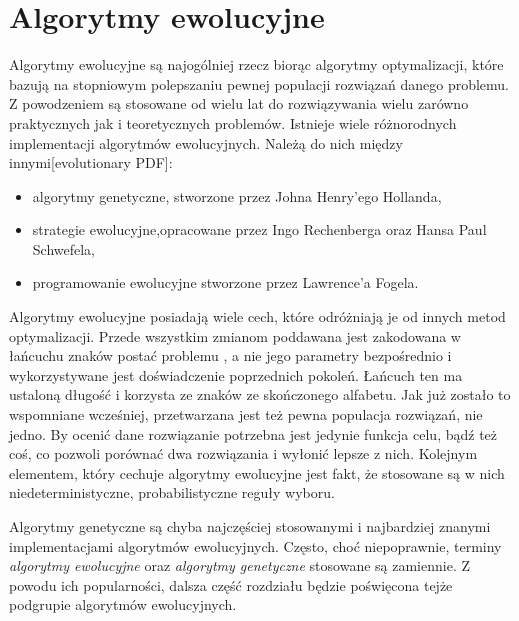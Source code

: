 \section{Algorytmy ewolucyjne}
\label{sec:AE}

Algorytmy ewolucyjne są najogólniej rzecz biorąc algorytmy optymalizacji, które bazują na stopniowym polepszaniu pewnej populacji rozwiązań danego problemu. Z powodzeniem są stosowane od wielu lat do rozwiązywania wielu zarówno praktycznych jak i teoretycznych problemów. Istnieje wiele różnorodnych implementacji algorytmów ewolucyjnych. Należą do nich między innymi[evolutionary PDF]:
\begin{itemize}
\item algorytmy genetyczne, stworzone przez Johna Henry'ego Hollanda,
\item strategie ewolucyjne,opracowane przez Ingo Rechenberga oraz Hansa Paul Schwefela,
\item programowanie ewolucyjne stworzone przez Lawrence'a Fogela.
\end{itemize}

Algorytmy ewolucyjne posiadają wiele cech, które odróżniają je od innych metod optymalizacji. Przede wszystkim zmianom poddawana jest zakodowana w łańcuchu znaków postać problemu , a nie jego parametry bezpośrednio i wykorzystywane jest doświadczenie poprzednich pokoleń. Łańcuch ten ma ustaloną długość i korzysta ze znaków ze skończonego alfabetu. Jak już zostało to wspomniane wcześniej, przetwarzana jest też pewna populacja rozwiązań, nie jedno. By ocenić dane rozwiązanie potrzebna jest jedynie funkcja celu, bądź też coś, co pozwoli porównać dwa rozwiązania i wyłonić lepsze z nich. Kolejnym elementem, który cechuje algorytmy ewolucyjne jest fakt, że stosowane są w nich niedeterministyczne, probabilistyczne reguły wyboru.

Algorytmy genetyczne są chyba najczęściej stosowanymi i najbardziej znanymi implementacjami algorytmów ewolucyjnych. Często, choć niepoprawnie, terminy \textit{algorytmy ewolucyjne} oraz \textit{algorytmy genetyczne} stosowane są zamiennie. Z powodu ich popularności, dalsza część rozdziału będzie poświęcona tejże podgrupie algorytmów ewolucyjnych.

